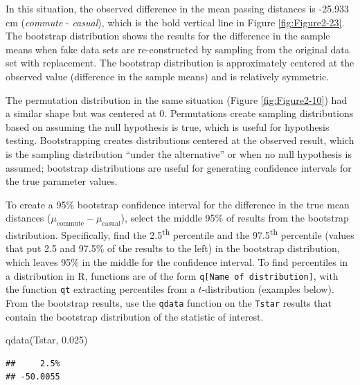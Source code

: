 \documentclass[
]{book}
\newenvironment{Shaded}{\begin{snugshade}}{\end{snugshade}}
\newcommand{\FloatTok}[1]{\textcolor[rgb]{0.00,0.00,0.81}{#1}}
\newcommand{\FunctionTok}[1]{\textcolor[rgb]{0.00,0.00,0.00}{#1}}
\newcommand{\NormalTok}[1]{#1}
\begin{document}
In this situation, the observed difference in the mean passing distances is -25.933 cm
(\emph{commute} - \emph{casual}), which is the bold vertical line in Figure
\ref{fig:Figure2-23}.
The bootstrap distribution
shows the results for the difference in the sample
means when fake data sets are re-constructed by sampling from the original data set with
replacement. The bootstrap distribution is approximately centered at the observed
value (difference in the sample means) and is relatively symmetric.

\indent The permutation distribution  in the same situation (Figure
\ref{fig:Figure2-10}) had a similar shape but was centered at 0.
Permutations create sampling
distributions
based on assuming the null hypothesis is true, which is useful for
hypothesis testing. Bootstrapping creates distributions centered at the observed
result, which is the sampling distribution ``under the alternative'' or when no null
hypothesis is assumed; bootstrap distributions are useful for generating
confidence intervals for the true parameter values.

\indent To create a 95\% bootstrap confidence interval for the difference in
the true mean distances (\(\mu_\text{commute}-\mu_\text{casual}\)), select the
middle 95\% of results from
the bootstrap distribution. Specifically, find the 2.5\textsuperscript{th}
percentile and the 97.5\textsuperscript{th} percentile (values that put 2.5 and 97.5\%
of the results to the left) in the bootstrap distribution, which leaves 95\% in
the middle for the confidence interval. To find percentiles in a distribution
in R, functions are of the form \texttt{q{[}Name\ of\ distribution{]}}, with the function
\texttt{qt} extracting percentiles from a \(t\)-distribution (examples below). From the
bootstrap results, use the \texttt{qdata} function on the \texttt{Tstar} results that
contain the bootstrap distribution of the statistic of interest.

\begin{Shaded}
\begin{Highlighting}[]
\FunctionTok{qdata}\NormalTok{(Tstar, }\FloatTok{0.025}\NormalTok{)}
\end{Highlighting}
\end{Shaded}

\begin{verbatim}
##     2.5% 
## -50.0055
\end{verbatim}
\end{document}
